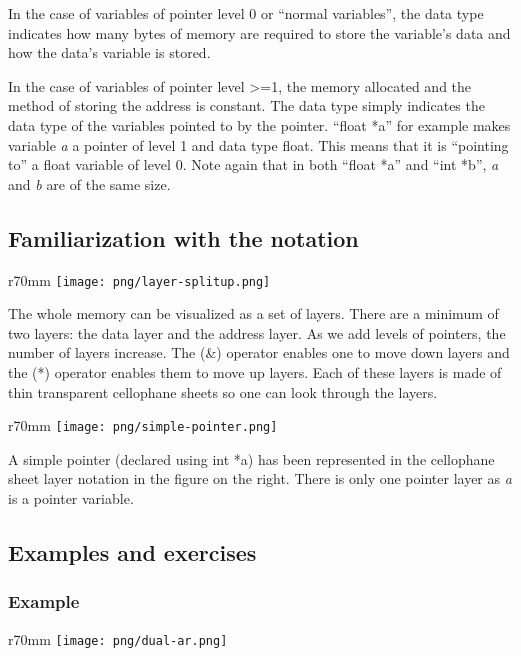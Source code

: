 \documentclass[10pt,twoside]{article}
\begin{document}
In the case of variables of pointer level 0 or ``normal variables'', the data
type indicates how many bytes of memory are required to store the variable's
data and how the data's variable is stored.

In the case of variables of pointer level {\textgreater}=1, the memory allocated
and the method of storing the address is constant. The data type simply
indicates the data type of the variables pointed to by the pointer. ``float *a''
for example makes variable \textit{a }\textup{a pointer of level 1 and data type
float. This means that it is ``pointing to'' a float variable of level 0. Note
again that in both ``float *a'' and ``int *b'', }\textit{a}\textup{ and
}\textit{b }\textup{are of the same size.} \newpage \subsection*{Familiarization
with the notation}

\begin{wrapfigure}{r}{70mm}
\texttt{[image: png/layer-splitup.png]}
\end{wrapfigure}

The whole memory can be visualized as a set of layers. There are a minimum of
two layers: the data layer and the address layer. As we add levels of pointers,
the number of layers increase. The (\&) operator enables one to move down layers
and the (*) operator enables them to move up layers. Each of these layers is
made of thin transparent cellophane sheets so one can look through the layers.

\begin{wrapfigure}{r}{70mm}
\texttt{[image: png/simple-pointer.png]}
\end{wrapfigure}

A simple pointer (declared using int *a) has been represented in the cellophane
sheet layer notation in the figure on the right. There is only one pointer layer
as \textit{a} is a pointer variable.

\subsection*{Examples and exercises}
\subsubsection*{Example}

\begin{wrapfigure}{r}{70mm}
\texttt{[image: png/dual-ar.png]}
\end{wrapfigure}
\end{document}
